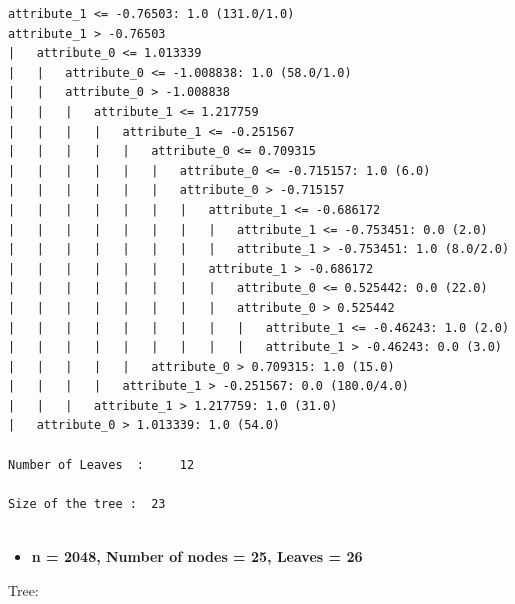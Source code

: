 \documentclass[a4paper]{article}
\theoremstyle{definition}
\newenvironment{soln}{
    \leavevmode\color{blue}\ignorespaces
}{}
\begin{document}
\begin{soln}
\begin{lstlisting}
attribute_1 <= -0.76503: 1.0 (131.0/1.0)
attribute_1 > -0.76503
|   attribute_0 <= 1.013339
|   |   attribute_0 <= -1.008838: 1.0 (58.0/1.0)
|   |   attribute_0 > -1.008838
|   |   |   attribute_1 <= 1.217759
|   |   |   |   attribute_1 <= -0.251567
|   |   |   |   |   attribute_0 <= 0.709315
|   |   |   |   |   |   attribute_0 <= -0.715157: 1.0 (6.0)
|   |   |   |   |   |   attribute_0 > -0.715157
|   |   |   |   |   |   |   attribute_1 <= -0.686172
|   |   |   |   |   |   |   |   attribute_1 <= -0.753451: 0.0 (2.0)
|   |   |   |   |   |   |   |   attribute_1 > -0.753451: 1.0 (8.0/2.0)
|   |   |   |   |   |   |   attribute_1 > -0.686172
|   |   |   |   |   |   |   |   attribute_0 <= 0.525442: 0.0 (22.0)
|   |   |   |   |   |   |   |   attribute_0 > 0.525442
|   |   |   |   |   |   |   |   |   attribute_1 <= -0.46243: 1.0 (2.0)
|   |   |   |   |   |   |   |   |   attribute_1 > -0.46243: 0.0 (3.0)
|   |   |   |   |   attribute_0 > 0.709315: 1.0 (15.0)
|   |   |   |   attribute_1 > -0.251567: 0.0 (180.0/4.0)
|   |   |   attribute_1 > 1.217759: 1.0 (31.0)
|   attribute_0 > 1.013339: 1.0 (54.0)

Number of Leaves  : 	12

Size of the tree : 	23


\end{lstlisting}

\vspace{1cm}



\begin{itemize}
	\item \textbf{n = 2048, Number of nodes = 25, Leaves = 26}
\end{itemize}
Tree:


\begin{lstlisting}



\end{lstlisting}
\end{soln}
\end{document}
